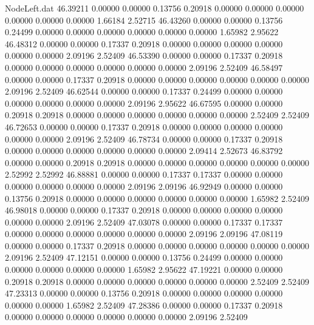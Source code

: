 \begin{filecontents}{NodeLeft.dat}
  46.39211    0.00000    0.00000     0.13756    0.20918    0.00000    0.00000    0.00000    0.00000    0.00000    0.00000    1.66184    2.52715
  46.43260    0.00000    0.00000     0.13756    0.24499    0.00000    0.00000    0.00000    0.00000    0.00000    0.00000    1.65982    2.95622
  46.48312    0.00000    0.00000     0.17337    0.20918    0.00000    0.00000    0.00000    0.00000    0.00000    0.00000    2.09196    2.52409
  46.53390    0.00000    0.00000     0.17337    0.20918    0.00000    0.00000    0.00000    0.00000    0.00000    0.00000    2.09196    2.52409
  46.58497    0.00000    0.00000     0.17337    0.20918    0.00000    0.00000    0.00000    0.00000    0.00000    0.00000    2.09196    2.52409
  46.62544    0.00000    0.00000     0.17337    0.24499    0.00000    0.00000    0.00000    0.00000    0.00000    0.00000    2.09196    2.95622
  46.67595    0.00000    0.00000     0.20918    0.20918    0.00000    0.00000    0.00000    0.00000    0.00000    0.00000    2.52409    2.52409
  46.72653    0.00000    0.00000     0.17337    0.20918    0.00000    0.00000    0.00000    0.00000    0.00000    0.00000    2.09196    2.52409
  46.78734    0.00000    0.00000     0.17337    0.20918    0.00000    0.00000    0.00000    0.00000    0.00000    0.00000    2.09414    2.52673
  46.83792    0.00000    0.00000     0.20918    0.20918    0.00000    0.00000    0.00000    0.00000    0.00000    0.00000    2.52992    2.52992
  46.88881    0.00000    0.00000     0.17337    0.17337    0.00000    0.00000    0.00000    0.00000    0.00000    0.00000    2.09196    2.09196
  46.92949    0.00000    0.00000     0.13756    0.20918    0.00000    0.00000    0.00000    0.00000    0.00000    0.00000    1.65982    2.52409
  46.98018    0.00000    0.00000     0.17337    0.20918    0.00000    0.00000    0.00000    0.00000    0.00000    0.00000    2.09196    2.52409
  47.03078    0.00000    0.00000     0.17337    0.17337    0.00000    0.00000    0.00000    0.00000    0.00000    0.00000    2.09196    2.09196
  47.08119    0.00000    0.00000     0.17337    0.20918    0.00000    0.00000    0.00000    0.00000    0.00000    0.00000    2.09196    2.52409
  47.12151    0.00000    0.00000     0.13756    0.24499    0.00000    0.00000    0.00000    0.00000    0.00000    0.00000    1.65982    2.95622
  47.19221    0.00000    0.00000     0.20918    0.20918    0.00000    0.00000    0.00000    0.00000    0.00000    0.00000    2.52409    2.52409
  47.23313    0.00000    0.00000     0.13756    0.20918    0.00000    0.00000    0.00000    0.00000    0.00000    0.00000    1.65982    2.52409
  47.28386    0.00000    0.00000     0.17337    0.20918    0.00000    0.00000    0.00000    0.00000    0.00000    0.00000    2.09196    2.52409

\end{filecontents}

